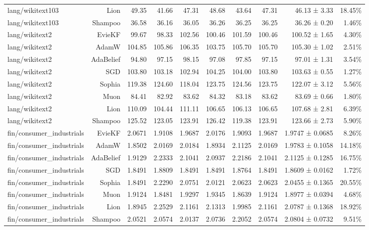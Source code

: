 \begin{table}[t]
\begin{tabular}{lrrrrrrrrr}
lang/wikitext103 & Lion & 49.35 & 41.66 & 47.31 & 48.68 & 43.64 & 47.31 & 46.13 ± 3.33 & 18.45\% \\
lang/wikitext103 & Shampoo & 36.58 & 36.16 & 36.05 & 36.26 & 36.25 & 36.25 & 36.26 ± 0.20 & 1.46\% \\
lang/wikitext2 & EvieKF & 99.67 & 98.33 & 102.56 & 100.46 & 101.59 & 100.46 & 100.52 ± 1.65 & 4.30\% \\
lang/wikitext2 & AdamW & 104.85 & 105.86 & 106.35 & 103.75 & 105.70 & 105.70 & 105.30 ± 1.02 & 2.51\% \\
lang/wikitext2 & AdaBelief & 94.80 & 97.15 & 98.15 & 97.08 & 97.85 & 97.15 & 97.01 ± 1.31 & 3.54\% \\
lang/wikitext2 & SGD & 103.80 & 103.18 & 102.94 & 104.25 & 104.00 & 103.80 & 103.63 ± 0.55 & 1.27\% \\
lang/wikitext2 & Sophia & 119.38 & 124.60 & 118.04 & 123.75 & 124.56 & 123.75 & 122.07 ± 3.12 & 5.56\% \\
lang/wikitext2 & Muon & 84.41 & 82.92 & 83.62 & 84.32 & 83.18 & 83.62 & 83.69 ± 0.66 & 1.80\% \\
lang/wikitext2 & Lion & 110.09 & 104.44 & 111.11 & 106.65 & 106.13 & 106.65 & 107.68 ± 2.81 & 6.39\% \\
lang/wikitext2 & Shampoo & 125.52 & 123.05 & 123.91 & 126.42 & 119.38 & 123.91 & 123.66 ± 2.73 & 5.90\% \\
fin/consumer\_industrials & EvieKF & 2.0671 & 1.9108 & 1.9687 & 2.0176 & 1.9093 & 1.9687 & 1.9747 ± 0.0685 & 8.26\% \\
fin/consumer\_industrials & AdamW & 1.8502 & 2.0169 & 2.0184 & 1.8934 & 2.1125 & 2.0169 & 1.9783 ± 0.1058 & 14.18\% \\
fin/consumer\_industrials & AdaBelief & 1.9129 & 2.2333 & 2.1041 & 2.0937 & 2.2186 & 2.1041 & 2.1125 ± 0.1285 & 16.75\% \\
fin/consumer\_industrials & SGD & 1.8491 & 1.8809 & 1.8491 & 1.8491 & 1.8764 & 1.8491 & 1.8609 ± 0.0162 & 1.72\% \\
fin/consumer\_industrials & Sophia & 1.8491 & 2.2290 & 2.0751 & 2.0121 & 2.0623 & 2.0623 & 2.0455 ± 0.1365 & 20.55\% \\
fin/consumer\_industrials & Muon & 1.9124 & 1.8481 & 1.9297 & 1.9345 & 1.8639 & 1.9124 & 1.8977 ± 0.0394 & 4.68\% \\
fin/consumer\_industrials & Lion & 1.8945 & 2.2529 & 2.1161 & 2.1313 & 1.9985 & 2.1161 & 2.0787 ± 0.1368 & 18.92\% \\
fin/consumer\_industrials & Shampoo & 2.0521 & 2.0574 & 2.0137 & 2.0736 & 2.2052 & 2.0574 & 2.0804 ± 0.0732 & 9.51\% \\

\end{tabular}
\end{table}
